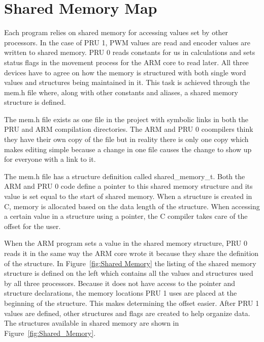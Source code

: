 \documentclass[12pt,oneside,final]{siuethesis}
\theoremstyle{definition}
\begin{document}
\section{Shared Memory Map}

Each program relies on shared memory for accessing values set by other processors. In the case of PRU 1, PWM values are read and encoder values are written to shared memory. PRU 0 reads constants for us in calculations and sets status flags in the movement process for the ARM core to read later. All three devices have to agree on how the memory is structured with both single word values and structures being maintained in it. This task is achieved through the mem.h file where, along with other constants and aliases, a shared memory structure is defined.

The mem.h file exists as one file in the project with symbolic links in both the PRU and ARM compilation directories. The ARM and PRU 0 coompilers think they have their own copy of the file but in reality there is only one copy which makes editing simple because a change in one file causes the change to show up for everyone with a link to it. 

The mem.h file has a structure definition called shared\_memory\_t. Both the ARM and PRU 0 code define a pointer to this shared memory structure and its value is set equal to the start of shared memory. When a structure is created in C, memory is allocated based on the data length of the structure. When accessing a certain value in a structure using a pointer, the C compiler takes care of the offset for the user. 

When the ARM program sets a value in the shared memory structure, PRU 0 reads it in the same way the ARM core wrote it because they share the definition of the structure. In Figure~\ref{fig:Shared Memory} the listing of the shared memory structure is defined on the left which contains all the values and structures used by all three processors. Because it does not have access to the pointer and structure declarations, the memory locations PRU 1 uses are placed at the beginning of the structure. This makes determining the offset easier. After PRU 1 values are defined, other structures and flags are created to help organize data. The structures available in shared memory are shown in Figure~\ref{fig:Shared_Memory}. 
\end{document}
